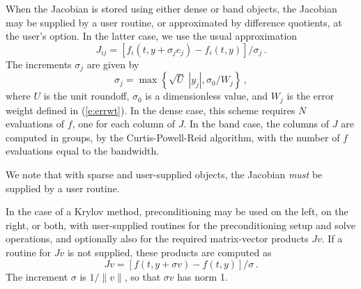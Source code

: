 When the Jacobian is stored using either dense or band {\sunmatrix}
objects, the Jacobian may be supplied by a user routine, or
approximated by difference quotients, at the user's option.  In the
latter case, we use the usual approximation
\[ J_{ij} = [f_i(t,y+\sigma_j e_j) - f_i(t,y)]/\sigma_j \, . \]
The increments $\sigma_j$ are given by
\[ \sigma_j = \max\left\{\sqrt{U} \; |y_j| , \sigma_0 / W_j \right\} \, , \]
where $U$ is the unit roundoff, $\sigma_0$ is a dimensionless value,
and $W_j$ is the error weight defined in (\ref{e:errwt}).  In the dense
case, this scheme requires $N$ evaluations of $f$, one for each column
of $J$.  In the band case, the columns of $J$ are computed in groups,
by the Curtis-Powell-Reid algorithm, with the number of $f$ evaluations
equal to the bandwidth.

We note that with sparse and user-supplied {\sunmatrix} objects, the
Jacobian {\em must} be supplied by a user routine.

In the case of a Krylov method, preconditioning may be used on the left, on the
right, or both, with user-supplied routines for the preconditioning
setup and solve operations, and optionally also for the required
matrix-vector products $Jv$.  If a routine for $Jv$ is not supplied,
these products are computed as
\begin{equation}\label{jacobv}
Jv = [f(t,y+\sigma v) - f(t,y)]/\sigma \, .
\end{equation}
The increment $\sigma$ is $1/\|v\|$, so that $\sigma v$ has norm 1.


